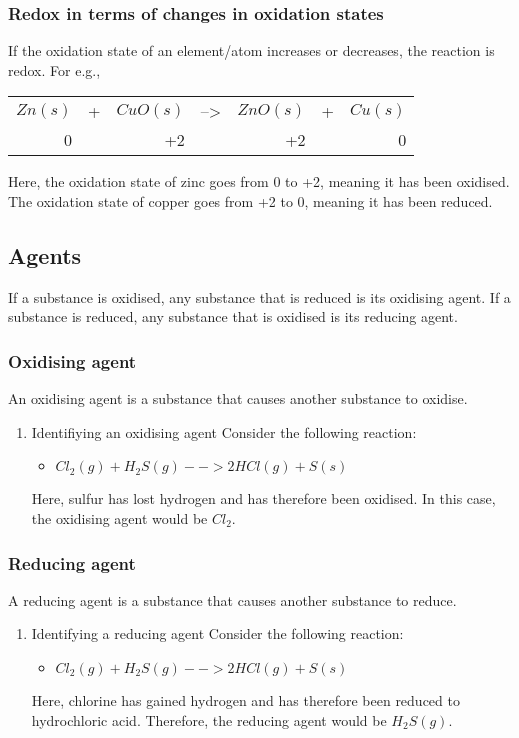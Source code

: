 \documentclass[11pt]{article}
\begin{document}
\subsubsection{Redox in terms of changes in oxidation states}
\label{sec:org9f91908}
If the oxidation state of an element/atom increases or decreases, the reaction is redox. For e.g.,
\begin{center}
\begin{tabular}{rlrlrlr}
\(Zn(s)\) & + & \(CuO(s)\) & --> & \(ZnO(s)\) & + & \(Cu(s)\)\\
0 &  & +2 &  & +2 &  & 0\\
\end{tabular}
\end{center}
Here, the oxidation state of zinc goes from 0 to +2, meaning it has been oxidised. The oxidation state of copper goes from +2 to 0, meaning it has been reduced.
\subsection{Agents}
\label{sec:org2f63f81}
If a substance is oxidised, any substance that is reduced is its oxidising agent. If a substance is reduced, any substance that is oxidised is its reducing agent.
\subsubsection{Oxidising agent}
\label{sec:org5de2305}
An oxidising agent is a substance that causes another substance to oxidise.
\begin{enumerate}
\item Identifiying an oxidising agent
\label{sec:orgd41efaa}
Consider the following reaction:
\begin{itemize}
\item \(Cl_2(g) + H_2S(g) --> 2HCl(g) + S(s)\)
\end{itemize}
Here, sulfur has lost hydrogen and has therefore been oxidised. In this case, the oxidising agent would be \(Cl_2\).
\end{enumerate}
\subsubsection{Reducing agent}
\label{sec:org825467a}
A reducing agent is a substance that causes another substance to reduce.
\begin{enumerate}
\item Identifying a reducing agent
\label{sec:org54d19f4}
Consider the following reaction:
\begin{itemize}
\item \(Cl_2(g) + H_2S(g) --> 2HCl(g) + S(s)\)
\end{itemize}
Here, chlorine has gained hydrogen and has therefore been reduced to hydrochloric acid. Therefore, the reducing agent would be \(H_2S(g)\).
\end{enumerate}
\end{document}
